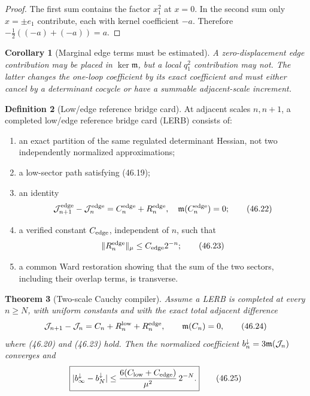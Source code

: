 \documentclass[11pt,oneside]{book}
\newtheorem{theorem}{Theorem}[chapter]
\newtheorem{corollary}[theorem]{Corollary}
\theoremstyle{definition}
\newtheorem{definition}[theorem]{Definition}
\theoremstyle{remark}
\begin{document}
\begin{proof}
The first sum contains the factor \(x_1^2\) at \(x=0\).  In the
second sum only \(x=\pm e_1\) contribute, each with kernel
coefficient \(-a\).  Therefore
\(-\frac12((-a)+(-a))=a\).
\end{proof}

\begin{corollary}[Marginal edge terms must be estimated]
\label{cor:e8v46-edge-marginal}
A zero-displacement edge contribution may be placed in
\(\ker{\mathfrak m}\), but a local \(q_1^2\) contribution may not.
The latter changes the one-loop coefficient by its exact
coefficient and must either cancel by a determinant cocycle or have
a summable adjacent-scale increment.
\end{corollary}

\begin{definition}[Low/edge reference bridge card]
\label{def:e8v46-LERB}
At adjacent scales \(n,n+1\), a completed low/edge reference bridge
card (LERB) consists of:
\begin{enumerate}
\item an exact partition of the same regulated determinant Hessian,
      not two independently normalized approximations;
\item a low-sector path satisfying (46.19);
\item an identity
      \[
       {\cal J}^{\rm edge}_{n+1}-{\cal J}^{\rm edge}_n
       =C_n^{\rm edge}+R_n^{\rm edge},\quad
       {\mathfrak m}(C_n^{\rm edge})=0;                        \tag{46.22}
      \]
\item a verified constant \(C_{\rm edge}\), independent of \(n\),
      such that
      \[
       \|R_n^{\rm edge}\|_\mu\le C_{\rm edge}2^{-n};           \tag{46.23}
      \]
\item a common Ward restoration showing that the sum of the two
      sectors, including their overlap terms, is transverse.
\end{enumerate}
\end{definition}

\begin{theorem}[Two-scale Cauchy compiler]
\label{thm:e8v46-two-scale-compiler}
Assume a LERB is completed at every \(n\ge N\), with uniform
constants and with the exact total adjacent difference
\[
 {\cal J}_{n+1}-{\cal J}_n
 =C_n+R_n^{\rm low}+R_n^{\rm edge},\qquad
 {\mathfrak m}(C_n)=0,                                       \tag{46.24}
\]
where (46.20) and (46.23) hold.  Then the normalized coefficient
\(b_n^\downarrow=3{\mathfrak m}({\cal J}_n)\) converges and
\[
 \boxed{
 |b_\infty^\downarrow-b_N^\downarrow|
 \le\frac{6(C_{\rm low}+C_{\rm edge})}{\mu^2}\,2^{-N}.}        \tag{46.25}
\]
\end{theorem}
\end{document}
